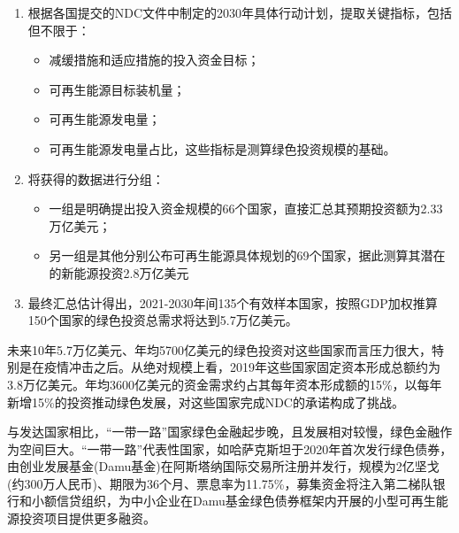 \begin{enumerate}
    \item 根据各国提交的NDC文件中制定的2030年具体行动计划，提取关键指标，包括但不限于：
          \begin{itemize}
              \item 减缓措施和适应措施的投入资金目标；
              \item 可再生能源目标装机量；
              \item 可再生能源发电量；
              \item 可再生能源发电量占比，这些指标是测算绿色投资规模的基础。
          \end{itemize}
    \item 将获得的数据进行分组：
          \begin{itemize}
              \item 一组是明确提出投入资金规模的66个国家，直接汇总其预期投资额为2.33万亿美元；
              \item 另一组是其他分别公布可再生能源具体规划的69个国家，据此测算其潜在的新能源投资2.8万亿美元
          \end{itemize}
    \item 最终汇总估计得出，2021-2030年间135个有效样本国家，按照GDP加权推算150个国家的绿色投资总需求将达到5.7万亿美元。
\end{enumerate}

未来10年5.7万亿美元、年均5700亿美元的绿色投资对这些国家而言压力很大，特别是在疫情冲击之后。从绝对规模上看，2019年这些国家固定资本形成总额约为3.8万亿美元。年均3600亿美元的资金需求约占其每年资本形成额的15\%，以每年新增15\%的投资推动绿色发展，对这些国家完成NDC的承诺构成了挑战。

与发达国家相比，“一带一路”国家绿色金融起步晚，且发展相对较慢，绿色金融作为空间巨大。“一带一路”代表性国家，如哈萨克斯坦于2020年首次发行绿色债券，由创业发展基金(Damu基金)在阿斯塔纳国际交易所注册并发行，规模为2亿坚戈(约300万人民币)、期限为36个月、票息率为11.75\%，募集资金将注入第二梯队银行和小额信贷组织，为中小企业在Damu基金绿色债券框架内开展的小型可再生能源投资项目提供更多融资。
